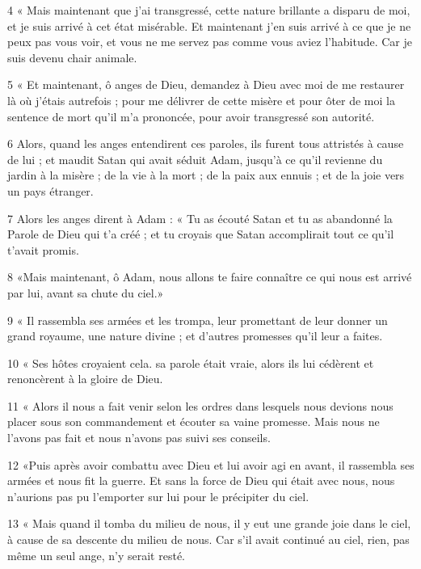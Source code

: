 \par 4 « Mais maintenant que j'ai transgressé, cette nature brillante a disparu de moi, et je suis arrivé à cet état misérable. Et maintenant j’en suis arrivé à ce que je ne peux pas vous voir, et vous ne me servez pas comme vous aviez l’habitude. Car je suis devenu chair animale.

\par 5 « Et maintenant, ô anges de Dieu, demandez à Dieu avec moi de me restaurer là où j'étais autrefois ; pour me délivrer de cette misère et pour ôter de moi la sentence de mort qu'il m'a prononcée, pour avoir transgressé son autorité.

\par 6 Alors, quand les anges entendirent ces paroles, ils furent tous attristés à cause de lui ; et maudit Satan qui avait séduit Adam, jusqu'à ce qu'il revienne du jardin à la misère ; de la vie à la mort ; de la paix aux ennuis ; et de la joie vers un pays étranger.

\par 7 Alors les anges dirent à Adam : « Tu as écouté Satan et tu as abandonné la Parole de Dieu qui t'a créé ; et tu croyais que Satan accomplirait tout ce qu'il t'avait promis.

\par 8 «Mais maintenant, ô Adam, nous allons te faire connaître ce qui nous est arrivé par lui, avant sa chute du ciel.»

\par 9 « Il rassembla ses armées et les trompa, leur promettant de leur donner un grand royaume, une nature divine ; et d'autres promesses qu'il leur a faites.

\par 10 « Ses hôtes croyaient cela. sa parole était vraie, alors ils lui cédèrent et renoncèrent à la gloire de Dieu.

\par 11 « Alors il nous a fait venir selon les ordres dans lesquels nous devions nous placer sous son commandement et écouter sa vaine promesse. Mais nous ne l’avons pas fait et nous n’avons pas suivi ses conseils.

\par 12 «Puis après avoir combattu avec Dieu et lui avoir agi en avant, il rassembla ses armées et nous fit la guerre. Et sans la force de Dieu qui était avec nous, nous n’aurions pas pu l’emporter sur lui pour le précipiter du ciel.

\par 13 « Mais quand il tomba du milieu de nous, il y eut une grande joie dans le ciel, à cause de sa descente du milieu de nous. Car s’il avait continué au ciel, rien, pas même un seul ange, n’y serait resté.

